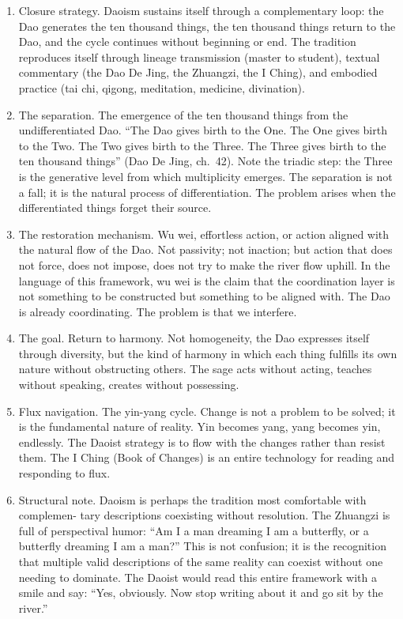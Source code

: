 \documentclass[
]{article}
\begin{document}
\begin{enumerate}
\def\labelenumi{\arabic{enumi}.}
\setcounter{enumi}{41}
\item
  Closure strategy. Daoism sustains itself through a complementary loop:
  the Dao generates the ten thousand things, the ten thousand things
  return to the Dao, and the cycle continues without beginning or end.
  The tradition reproduces itself through lineage transmission (master
  to student), textual commentary (the Dao De Jing, the Zhuangzi, the I
  Ching), and embodied practice (tai chi, qigong, meditation, medicine,
  divination).
\item
  The separation. The emergence of the ten thousand things from the
  undifferentiated Dao. ``The Dao gives birth to the One. The One gives
  birth to the Two. The Two gives birth to the Three. The Three gives
  birth to the ten thousand things'' (Dao De Jing, ch.~42). Note the
  triadic step: the Three is the generative level from which
  multiplicity emerges. The separation is not a fall; it is the natural
  process of differentiation. The problem arises when the differentiated
  things forget their source.
\item
  The restoration mechanism. Wu wei, effortless action, or action
  aligned with the natural flow of the Dao. Not passivity; not inaction;
  but action that does not force, does not impose, does not try to make
  the river flow uphill. In the language of this framework, wu wei is
  the claim that the coordination layer is not something to be
  constructed but something to be aligned with. The Dao is already
  coordinating. The problem is that we interfere.
\item
  The goal. Return to harmony. Not homogeneity, the Dao expresses itself
  through diversity, but the kind of harmony in which each thing
  fulfills its own nature without obstructing others. The sage acts
  without acting, teaches without speaking, creates without possessing.
\item
  Flux navigation. The yin-yang cycle. Change is not a problem to be
  solved; it is the fundamental nature of reality. Yin becomes yang,
  yang becomes yin, endlessly. The Daoist strategy is to flow with the
  changes rather than resist them. The I Ching (Book of Changes) is an
  entire technology for reading and responding to flux.
\item
  Structural note. Daoism is perhaps the tradition most comfortable with
  complemen- tary descriptions coexisting without resolution. The
  Zhuangzi is full of perspectival humor: ``Am I a man dreaming I am a
  butterfly, or a butterfly dreaming I am a man?'' This is not
  confusion; it is the recognition that multiple valid descriptions of
  the same reality can coexist without one needing to dominate. The
  Daoist would read this entire framework with a smile and say: ``Yes,
  obviously. Now stop writing about it and go sit by the river.''
\end{enumerate}
\end{document}
